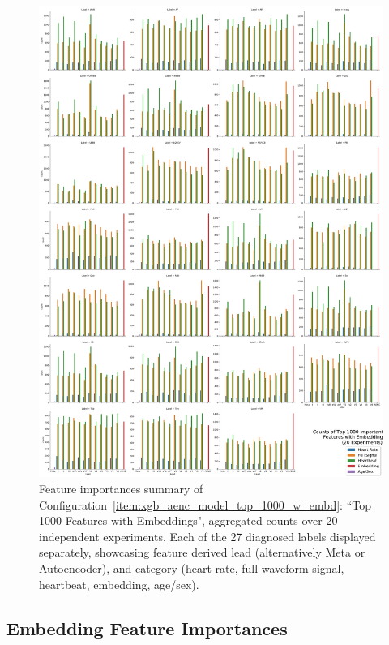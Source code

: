 \documentclass[\main/thesis.tex]{subfiles}
\begin{document}
\begin{figure}[t]
    \centering
    \includegraphics[width=\textwidth]{figure/top_1000_feature_importances_all_w_embedding.pdf}
    \caption{Feature importances summary of Configuration~\ref{item:xgb_aenc_model_top_1000_w_embd}: ``Top 1000 Features with Embeddings", aggregated counts over 20 independent experiments. Each of the 27 diagnosed labels displayed separately, showcasing feature derived lead (alternatively Meta or Autoencoder), and category (heart rate, full waveform signal, heartbeat, embedding, age/sex).}
    \label{fig:xgb_aenc_top_1000_features_labelwise}
\end{figure}

\subsection{Embedding Feature Importances}
\end{document}
